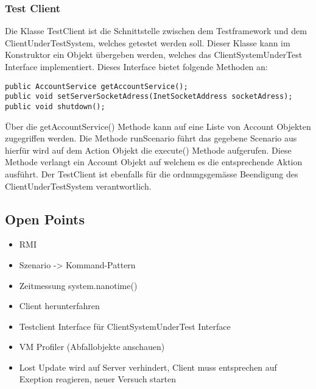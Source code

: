 \subsubsection{Test Client}
\label{sec:testclient}
Die Klasse TestClient ist die Schnittstelle zwischen dem Testframework und dem ClientUnderTestSystem, welches getestet werden soll. Dieser Klasse kann im Konstruktor ein Objekt übergeben werden, welches das ClientSystemUnderTest Interface implementiert. Dieses Interface bietet folgende Methoden an:
\begin{lstlisting}
public AccountService getAccountService();
public void setServerSocketAdress(InetSocketAddress socketAdress);
public void shutdown();
\end{lstlisting}	
Über die getAccountService() Methode kann auf eine Liste von Account Objekten zugegriffen werden. Die Methode runScenario führt das gegebene Scenario aus hierfür wird auf dem Action Objekt die execute() Methode aufgerufen. Diese Methode verlangt ein Account Objekt auf welchem es die entsprechende Aktion ausführt. Der TestClient ist ebenfalls für die ordnungsgemässe Beendigung des ClientUnderTestSystem verantwortlich.


\subsection{Open Points}
\begin{itemize}
\item RMI
\item Szenario -> Kommand-Pattern
\item Zeitmessung system.nanotime()
\item Client herunterfahren
\item Testclient Interface für ClientSystemUnderTest Interface
\item VM Profiler (Abfallobjekte anschauen)
\item Lost Update wird auf Server verhindert, Client muss entsprechen auf Exeption reagieren, neuer Versuch starten
\end{itemize}


